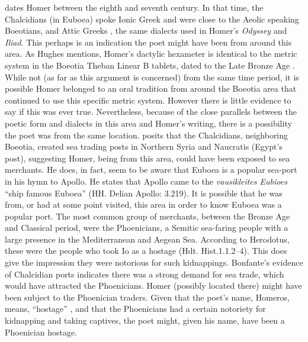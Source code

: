 \textcite[49]{Morford2011} dates Homer between the eighth and seventh century\BC. In that time, the Chalcidians (in Euboea) spoke Ionic Greek and were close to the Aeolic speaking Boeotians, and Attic Greeks \parencite[51]{Woodard2008}, the same dialects used in Homer’s \emph{Odyssey} and \emph{Iliad}.  This perhaps is an indication the poet might have been from around this area. As Hughes mentions, Homer’s dactylic hexameter is identical to the metric system in the Boeotia Theban Linear B tablets, dated to the Late Bronze Age \parencite[198]{Hughes2013}. While not (as far as this argument is concerned) from the same time period, it is possible Homer belonged to an oral tradition from around the Boeotia area that continued to use this specific metric system. However there is little evidence to say if this was ever true. Nevertheless, because of the close parallels between the poetic form and dialects in this area and Homer’s writing, there is a possibility the poet was from the same location. \textcite[69]{Bonfante1986} posits that the Chalcidians, neighboring Boeotia, created sea trading posts in Northern Syria and Naucratis (Egypt’s post), suggesting Homer, being from this area, could have been exposed to sea merchants. He does, in fact, seem to be aware that Euboea is a popular sea-port in his hymn to Apollo. He states that Apollo came to the \emph{vausikleites Eubioes} “ship famous Euboea” (HH. Delian Apollo: 3.219). It is possible that he was from, or had at some point visited, this area in order to know Euboea was a popular port. The most common group of merchants, between the Bronze Age and Classical period, were the Phoenicians, a Semitic sea-faring people with a large presence in the Mediterranean and Aegean Sea.  According to Herodotus, these were the people who took Io as a hostage (Hdt. Hist.1.1.2–4). This does give the impression they were notorious for such kidnappings. Bonfante’s evidence of Chalcidian ports indicates there was a strong demand for sea trade, which would have attracted the Phoenicians. Homer (possibly located there) might have been subject to the Phoenician traders. Given that the poet’s name, Homeros, means, “hostage” \parencite{Liddell1940}, and that the Phoenicians had a certain notoriety for kidnapping and taking captives, the poet might, given his name, have been a Phoenician hostage.
	
